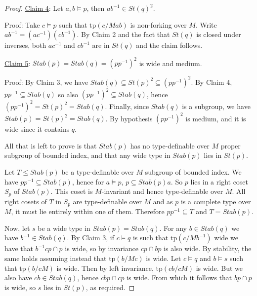 \documentclass[12pt]{article}
\theoremstyle{definition}
\theoremstyle{mystyle}
\theoremstyle{remark}
\newcommand{\tp}{\mathrm{tp}}
\begin{document}
\begin{proof}
\smallskip \noindent
\underline{Claim 4}: Let $a,b\models p$, then $ab^{-1}\in St(q)^2$.

\noindent
Proof: Take $c\models p$ such that $\tp(c/Mab)$ is non-forking over $M$. Write $ab^{-1} = (ac^{-1})(cb^{-1})$. By Claim 2 and the fact that $St(q)$ is closed under inverses, both $ac^{-1}$ and $cb^{-1}$ are in $St(q)$ and the claim follows.

\smallskip \noindent
\underline{Claim 5}: $Stab(p)=Stab(q)=(pp^{-1})^2$ is wide and medium.

\noindent
Proof: By Claim 3, we have $Stab(q)\subseteq St(p)^2 \subseteq (pp^{-1})^2$. By Claim 4, $pp^{-1} \subseteq Stab(q)$ so also $(pp^{-1})^2 \subseteq Stab(q)$, hence $(pp^{-1})^2 = St(p)^2=Stab(q)$. Finally, since $Stab(q)$ is a subgroup, we have $Stab(p)=St(p)^2=Stab(q)$. By hypothesis $(pp^{-1})^2$ is medium, and it is wide since it contains $q$.


\smallskip

All that is left to prove is that $Stab(p)$ has no type-definable over $M$ proper subgroup of bounded index, and that any wide type in $Stab(p)$ lies in $St(p)$.

Let $T\leq Stab(p)$ be a type-definable over $M$ subgroup of bounded index. We have $pp^{-1}\subseteq Stab(p)$, hence for $a\models p$, $p\subseteq Stab(p)a$. So $p$ lies in a right coset $S_p$ of $Stab(p)$. This coset is $M$-invariant and hence type-definable over $M$. All  right cosets of $T$ in $S_p$ are type-definable over $M$ and as $p$ is a complete type over $M$, it must lie entirely within one of them. Therefore $pp^{-1}\subseteq T$ and $T=Stab(p)$.

Now, let $s$ be a wide type in $Stab(p)=Stab(q)$. For any $b\in
Stab(q)$ we have $b^{-1}\in Stab(q)$. By Claim 3, if $c\models q$
is such that $\tp(c/Mb^{-1})$ wide we have that $b^{-1}cp\cap p$
is wide, so by invariance $cp\cap bp$ is also wide. By stability,
the same holds assuming instead that $\tp(b/Mc)$ is wide. Let
$c\models q$ and $b\models s$ such that $\tp(b/cM)$ is wide. Then
by left invariance, $\tp(cb/cM)$ is wide. But we also have $cb \in
Stab(q)$, hence $cbp\cap cp$ is wide. From which it follows that
$bp \cap p$ is wide, so $s$ lies in $St(p)$, as
required.\end{proof}



\end{document}
